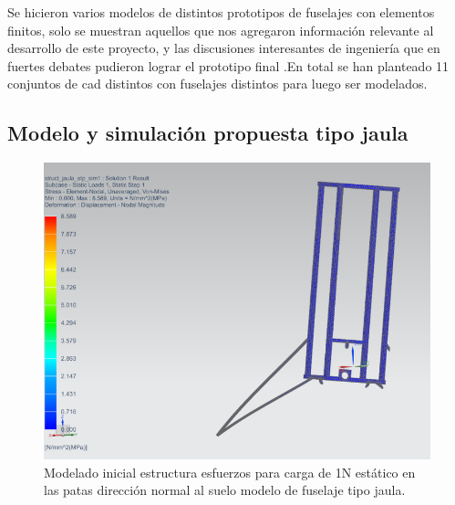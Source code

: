 Se hicieron varios modelos de distintos prototipos de fuselajes con elementos finitos, solo se muestran aquellos que nos agregaron información relevante al desarrollo de este proyecto, y las discusiones interesantes de ingeniería que en fuertes debates pudieron lograr el prototipo final .En total se han planteado 11 conjuntos de cad distintos con fuselajes distintos para luego ser modelados.

\null\newpage
\clearpage

\subsection{Modelo y simulación propuesta tipo jaula}
\begin{figure}[htb]
    \centering
    \includegraphics[width=\linewidth]{fig/fea/jaula.png}
    \caption{Modelado inicial estructura esfuerzos para carga de 1N estático en las patas dirección normal al suelo modelo de fuselaje tipo jaula.}
    \label{fig:fea/jaula}
\end{figure}

